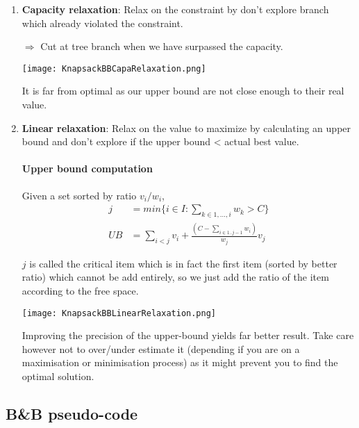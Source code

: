 \begin{enumerate}
    \item \textbf{Capacity relaxation}: Relax on the constraint by don't
        explore branch which already violated the constraint.

        $\Rightarrow$ Cut at tree branch when 
        we have surpassed the capacity.
        \begin{center}
        \texttt{[image: KnapsackBBCapaRelaxation.png]}
        \end{center}
        It is far from optimal as our upper bound are not close enough to their real
        value.

    \item \textbf{Linear relaxation}: Relax on the value to maximize by
        calculating an upper bound and don't explore if the upper bound <
        actual best value.

        \paragraph{Upper bound computation}
        Given a set sorted by ratio $v_i/w_i$,
        \begin{eqnarray*}
            j &= min\{i \in I: \sum_{k \in 1,...,i} w_k > C\}\\
            UB &= \sum_{i<j} v_i + \frac{(C - \sum_{i \in 1..j-1} w_i)}{w_j} v_j
        \end{eqnarray*}

        $j$ is called the critical item which is in fact the first item (sorted by better ratio)
        which cannot be add entirely, so we just add the ratio of the item according to 
        the free space.

        \begin{center}
            \texttt{[image: KnapsackBBLinearRelaxation.png]}
        \end{center}

        Improving the precision of the upper-bound yields far better
        result. Take care however not to over/under estimate it (depending if you are
        on a maximisation or minimisation process) as it might prevent you to find the
        optimal solution.

\end{enumerate}


\subsection{B\&B pseudo-code}


